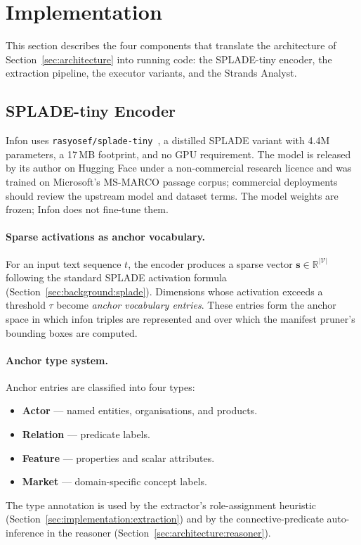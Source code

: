 \section{Implementation}
\label{sec:implementation}

This section describes the four components that translate the architecture of
Section~\ref{sec:architecture} into running code: the SPLADE-tiny encoder,
the extraction pipeline, the executor variants, and the Strands Analyst.

\subsection{SPLADE-tiny Encoder}
\label{sec:implementation:encoder}

Infon uses \texttt{rasyosef/splade-tiny}~\cite{alemneh2025spladetiny}, a
distilled SPLADE variant with 4.4M parameters, a 17\,MB footprint, and no
GPU requirement.  The model is released by its author on Hugging Face
under a non-commercial research licence and was trained on Microsoft's
MS-MARCO passage corpus; commercial deployments should review the
upstream model and dataset terms.  The model weights are frozen; Infon
does not fine-tune them.

\paragraph{Sparse activations as anchor vocabulary.}
For an input text sequence $t$, the encoder produces a sparse vector
$\mathbf{s} \in \mathbb{R}^{|\mathcal{V}|}$ following the standard SPLADE
activation formula (Section~\ref{sec:background:splade}).  Dimensions whose
activation exceeds a threshold $\tau$ become \emph{anchor vocabulary entries}.
These entries form the anchor space in which infon triples are represented and
over which the manifest pruner's bounding boxes are computed.

\paragraph{Anchor type system.}
Anchor entries are classified into four types:
\begin{itemize}
  \item \textbf{Actor} --- named entities, organisations, and products.
  \item \textbf{Relation} --- predicate labels.
  \item \textbf{Feature} --- properties and scalar attributes.
  \item \textbf{Market} --- domain-specific concept labels.
\end{itemize}
The type annotation is used by the extractor's role-assignment heuristic
(Section~\ref{sec:implementation:extraction}) and by the connective-predicate
auto-inference in the reasoner
(Section~\ref{sec:architecture:reasoner}).


